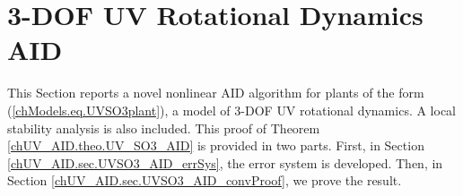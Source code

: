 \section{3-\acs{DOF} \acs{UV} Rotational Dynamics \acs{AID}}
\label{chUV_AID.sec.UV_SO3_AID}


This Section reports a novel nonlinear \ac{AID} algorithm for plants
of the form (\ref{chModels.eq.UVSO3plant}), a model of 3-\ac{DOF}
\ac{UV} rotational dynamics.
%
A local stability analysis is also included. 
%
This proof of Theorem \ref{chUV_AID.theo.UV_SO3_AID} is provided in
two parts.
%
First, in Section \ref{chUV_AID.sec.UVSO3_AID_errSys}, the error system
is developed.
%
Then, in Section \ref{chUV_AID.sec.UVSO3_AID_convProof}, we prove the result.  


%




